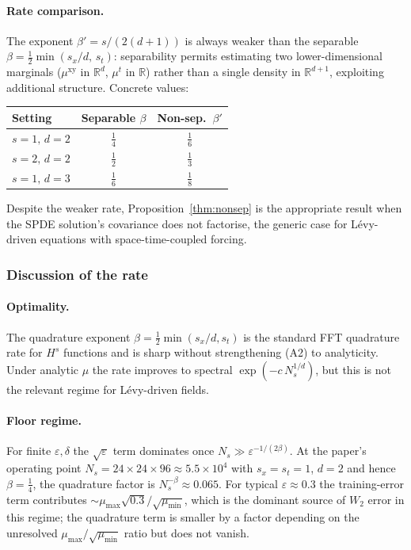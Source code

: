 \documentclass[review,12pt]{elsarticle}
\begin{document}
\paragraph{Rate comparison.}
The exponent \(\beta' = s/(2(d+1))\) is always weaker than the
separable \(\beta = \tfrac12\min(s_x/d,\,s_t)\): separability permits
estimating two lower-dimensional marginals (\(\mu^{\mathrm{xy}}\) in
\(\mathbb R^d\), \(\mu^t\) in \(\mathbb R\)) rather than a single
density in \(\mathbb R^{d+1}\), exploiting additional structure.
Concrete values:
\begin{center}
\begin{tabular}{lcc}
\toprule
Setting & Separable \(\beta\) & Non-sep.\ \(\beta'\) \\
\midrule
\(s=1,\,d=2\) & \(\tfrac14\) & \(\tfrac16\) \\
\(s=2,\,d=2\) & \(\tfrac12\) & \(\tfrac13\) \\
\(s=1,\,d=3\) & \(\tfrac16\) & \(\tfrac18\) \\
\bottomrule
\end{tabular}
\end{center}
Despite the weaker rate, Proposition~\ref{thm:nonsep} is the
appropriate result when the SPDE solution's covariance does not
factorise, the generic case for L\'evy-driven equations with
space-time-coupled forcing.

\subsubsection{Discussion of the rate}

\paragraph{Optimality.}
The quadrature exponent
\(\beta = \tfrac12\min(s_x/d, s_t)\) is the standard FFT quadrature
rate for \(H^s\) functions and is sharp without strengthening (A2) to
analyticity. Under analytic \(\mu\) the rate improves to spectral
\(\exp(-c\,N_s^{1/d})\), but this is not the relevant regime for
L\'evy-driven fields.

\paragraph{Floor regime.}
For finite \(\varepsilon, \delta\) the \(\sqrt\varepsilon\) term
dominates once \(N_s \gg \varepsilon^{-1/(2\beta)}\). At the paper's
operating point \(N_s = 24 \times 24 \times 96 \approx 5.5 \times
10^4\) with \(s_x = s_t = 1\), \(d = 2\) and hence
\(\beta = \tfrac14\), the quadrature factor is
\(N_s^{-\beta} \approx 0.065\). For typical
\(\varepsilon \approx 0.3\) the training-error term contributes
\(\sim \mu_{\max}\sqrt{0.3}/\sqrt{\mu_{\min}}\), which is the
dominant source of \(W_2\) error in this regime; the quadrature
term is smaller by a factor depending on the unresolved
\(\mu_{\max}/\sqrt{\mu_{\min}}\) ratio but does not vanish.
\end{document}
